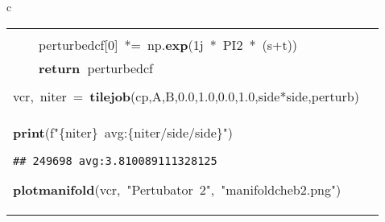 \documentclass{article}\usepackage[]{graphicx}\usepackage[dvipsnames,table]{xcolor}
\makeatletter
\newcommand{\hlnum}[1]{\textcolor[rgb]{0.686,0.059,0.569}{#1}}%
\newcommand{\hlsng}[1]{\textcolor[rgb]{0.192,0.494,0.8}{#1}}%
\newcommand{\hlopt}[1]{\textcolor[rgb]{0,0,0}{#1}}%
\newcommand{\hldef}[1]{\textcolor[rgb]{0.345,0.345,0.345}{#1}}%
\newcommand{\hlkwa}[1]{\textcolor[rgb]{0.161,0.373,0.58}{\textbf{#1}}}%
\newcommand{\hlkwb}[1]{\textcolor[rgb]{0.69,0.353,0.396}{#1}}%
\newcommand{\hlkwd}[1]{\textcolor[rgb]{0.737,0.353,0.396}{\textbf{#1}}}%
\let\hlipl\hlkwb
\newenvironment{kframe}{%
 \def\at@end@of@kframe{}%
 \ifinner\ifhmode%
  \def\at@end@of@kframe{\end{minipage}}%
  \begin{minipage}{\columnwidth}%
 \fi\fi%
 \def\FrameCommand##1{\hskip\@totalleftmargin \hskip-\fboxsep
 \colorbox{shadecolor}{##1}\hskip-\fboxsep
     \hskip-\linewidth \hskip-\@totalleftmargin \hskip\columnwidth}%
 \MakeFramed {\advance\hsize-\width
   \@totalleftmargin\z@ \linewidth\hsize
   \@setminipage}}%
 {\par\unskip\endMakeFramed%
 \at@end@of@kframe}
\newenvironment{knitrout}{}{} %
\makeatother
\begin{document}
\begin{center}
\begin{tabular}{c}
\begin{tabular}{m{10cm}m{10cm}}
\begin{minipage}[m]{10cm}
\begin{knitrout}
\begin{kframe}
\hldef{}\hldef{\ \ \ \ }\hldef{perturbed\textunderscore cf}\hlopt{{[}{-}}\hldef{}\hlnum{10}\hldef{}\hlopt{{]}}\hldef{\ \ }\hlopt{+=\ }\hldef{np}\hlopt{.}\hldef{}\hlkwd{exp}\hldef{}\hlopt{(}\hldef{}\hlnum{1}\hldef{j\ }\hlopt{{*}\ }\hldef{PI2\ }\hlopt{{*}\ (}\hldef{s\ }\hlopt{+\ }\hldef{t}\hlopt{))}\hspace*{\fill}\\
\hldef{}\hldef{\ \ \ \ }\hldef{perturbed\textunderscore cf}\hlopt{{[}}\hldef{}\hlnum{0}\hldef{}\hlopt{{]}\ {*}=\ }\hldef{np}\hlopt{.}\hldef{}\hlkwd{exp}\hldef{}\hlopt{(}\hldef{}\hlnum{1}\hldef{j\ }\hlopt{{*}\ }\hldef{PI2\ }\hlopt{{*}\ (}\hldef{s}\hlopt{+}\hldef{t}\hlopt{))}\hspace*{\fill}\\
\hldef{}\hldef{\ \ \ \ }\hldef{}\hlkwa{return\ }\hldef{perturbed\textunderscore cf}\hspace*{\fill}\\
\hldef{}\hspace*{\fill}\\
\hldef{vcr}\hlopt{,\ }\hldef{niter\ }\hlopt{=\ }\hldef{}\hlkwd{tile\textunderscore job}\hldef{}\hlopt{(}\hldef{cp}\hlopt{,}\hldef{A}\hlopt{,}\hldef{B}\hlopt{,}\hldef{}\hlnum{0.0}\hldef{}\hlopt{,}\hldef{}\hlnum{1.0}\hldef{}\hlopt{,}\hldef{}\hlnum{0.0}\hldef{}\hlopt{,}\hldef{}\hlnum{1.0}\hldef{}\hlopt{,}\hldef{side}\hlopt{{*}}\hldef{side}\hlopt{,}\hldef{perturb\textunderscore 2}\hlopt{)}\hspace*{\fill}\\
\hldef{}\hlkwa{print}\hldef{}\hlopt{(}\hldef{f}\hlsng{"}\hlipl{\{niter\}\ }\hlsng{avg:}\hlipl{\{niter/side/side\}}\hlsng{"}\hldef{}\hlopt{)}\hldef{}\hspace*{\fill}
\mbox{}
\normalfont
\begin{verbatim}
## 249698 avg:3.810089111328125
\end{verbatim}
\noindent
\ttfamily
\hldef{}\hlkwd{plot\textunderscore manifold}\hldef{}\hlopt{(}\hldef{vcr}\hlopt{,\ }\hldef{}\hlsng{"Pertubator\ 2"}\hldef{}\hlopt{,\ }\hldef{}\hlsng{"manifold\textunderscore cheb2.png"}\hldef{}\hlopt{)}\hldef{}\hspace*{\fill}
\mbox{}
\normalfont
\end{kframe}
\end{knitrout}
\end{minipage}
&
\begin{minipage}[m]{10cm}
\begin{knitrout}\tiny
\definecolor{shadecolor}{rgb}{0.969, 0.969, 0.969}\color{fgcolor}\begin{kframe}

\end{kframe}
\end{knitrout}
\end{minipage}
\end{tabular}
\end{tabular}
\end{center}
\end{document}

